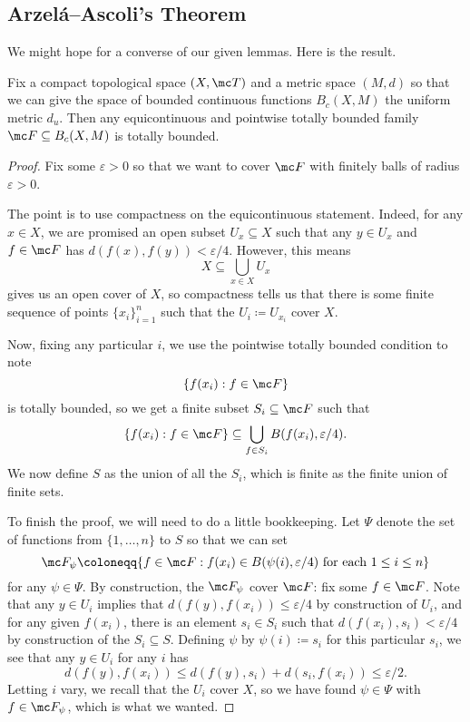 \documentclass[../notes.tex]{subfiles}
\begin{document}
\subsection{Arzel\'a--Ascoli's Theorem}
We might hope for a converse of our given lemmas. Here is the result.
\begin{theorem} \label{thm:ascoli}
	Fix a compact
	 topological space $(X,\mc T)$ and a metric space $(M,d)$ so that we can give the space of bounded continuous functions $B_c(X,M)$ the uniform metric $d_u$. Then any equicontinuous and pointwise totally bounded family $\mc F\subseteq B_c(X,M)$ is totally bounded.
\end{theorem}
\begin{proof}
	Fix some $\varepsilon>0$ so that we want to cover $\mc F$ with finitely balls of radius $\varepsilon>0$.
	
	The point is to use compactness on the equicontinuous statement. Indeed, for any $x\in X$, we are promised an open subset $U_x\subseteq X$ such that any $y\in U_x$ and $f\in\mc F$ has $d(f(x),f(y))<\varepsilon/4$. However, this means
	\[X\subseteq\bigcup_{x\in X}U_x\]
	gives us an open cover of $X$, so compactness tells us that there is some finite sequence of points $\{x_i\}_{i=1}^n$ such that the $U_i\coloneqq U_{x_i}$ cover $X$.

	Now, fixing any particular $i$, we use the pointwise totally bounded condition to note
	\[\{f(x_i):f\in\mc F\}\]
	is totally bounded, so we get a finite subset $S_i\subseteq\mc F$ such that
	\[\{f(x_i):f\in\mc F\}\subseteq\bigcup_{f\in S_i}B(f(x_i),\varepsilon/4).\]
	We now define $S$ as the union of all the $S_i$, which is finite as the finite union of finite sets.

	To finish the proof, we will need to do a little bookkeeping. Let $\Psi$ denote the set of functions from $\{1,\ldots,n\}$ to $S$ so that we can set
	\[\mc F_\psi\coloneqq\{f\in\mc F:f(x_i)\in B(\psi(i),\varepsilon/4)\text{ for each }1\le i\le n\}\]
	for any $\psi\in\Psi$. By construction, the $\mc F_\psi$ cover $\mc F$: fix some $f\in\mc F$. Note that any $y\in U_i$ implies that $d(f(y),f(x_i))\le\varepsilon/4$ by construction of $U_i$, and for any given $f(x_i)$, there is an element $s_i\in S_i$ such that $d(f(x_i),s_i)<\varepsilon/4$ by construction of the $S_i\subseteq S$. Defining $\psi$ by $\psi(i)\coloneqq s_i$ for this particular $s_i$, we see that any $y\in U_i$ for any $i$ has
	\[d(f(y),f(x_i))\le d(f(y),s_i)+d(s_i,f(x_i))\le\varepsilon/2.\]
	Letting $i$ vary, we recall that the $U_i$ cover $X$, so we have found $\psi\in\Psi$ with $f\in\mc F_\psi$, which is what we wanted.
	

\end{proof}
\end{document}
